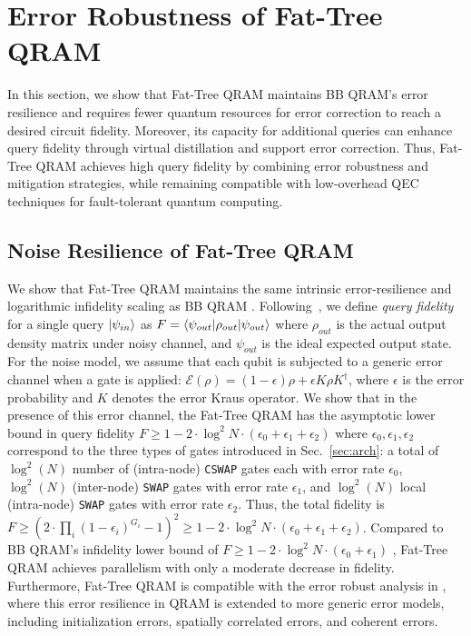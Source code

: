\section{Error Robustness of Fat-Tree QRAM}\label{sec:qec}
In this section, we show that Fat-Tree QRAM maintains BB QRAM's error resilience \cite{hann, xu2023systems} and requires fewer quantum resources for error correction to reach a desired circuit fidelity. Moreover, its capacity for additional queries can enhance query fidelity through virtual distillation \cite{huggins2021virtual} and support error correction. Thus, Fat-Tree QRAM achieves high query fidelity by combining error robustness and mitigation strategies, while remaining compatible with low-overhead QEC techniques for fault-tolerant quantum computing.

\subsection{Noise Resilience of Fat-Tree QRAM}
\label{subsec:noise}

We show that Fat-Tree QRAM maintains the same intrinsic error-resilience and logarithmic infidelity scaling as BB QRAM \cite{hann,xu2023systems}. Following~\cite{hann}, we define \textit{query fidelity} for a single query $\ket{\psi_{in}}$ as $F = \braket{\psi_{out}|\rho_{out}|\psi_{out}}$
where $\rho_{out}$ is the actual output density matrix under noisy channel, and $\psi_{out}$ is the ideal expected output state. For the noise model, we assume that each qubit is subjected to a generic error channel when a gate is applied:
$\mathcal{E}(\rho) = (1-\epsilon) \rho + \epsilon K\rho K^\dag$, where $\epsilon$ is the error probability and  $K$ denotes the error Kraus operator. We show that in the presence of this error channel, the Fat-Tree QRAM has the asymptotic lower bound in query fidelity $F \ge 1 - 2 \cdot \log^2{N}\cdot (\epsilon_0+\epsilon_1+\epsilon_2)$ where $\epsilon_0,\epsilon_1, \epsilon_2$ correspond to the three types of gates introduced in Sec.~\ref{sec:arch}: a total of $\log^2(N)$ number of (intra-node) \texttt{CSWAP} gates each with error rate $\epsilon_0$,  $\log^2(N)$ (inter-node) \texttt{SWAP} gates with error rate $\epsilon_1$, and $\log^2(N)$ local (intra-node) \texttt{SWAP} gates with error rate $\epsilon_2$. Thus, the total fidelity is $F \ge (2 \cdot \prod_i(1-\epsilon_i)^{G_i}-1)^2 \ge 1 - 2 \cdot \log^2{N}\cdot (\epsilon_0+\epsilon_1+\epsilon_2)$.
Compared to BB QRAM's infidelity lower bound of $F \ge 1 -  2\cdot\log^2{N}\cdot(\epsilon_0+\epsilon_1)$ \cite{hann}, Fat-Tree QRAM achieves parallelism with only a moderate decrease in fidelity. Furthermore, Fat-Tree QRAM is compatible with the error robust analysis in \cite{mehta2024analysis}, where this error resilience in QRAM is extended to more generic error models, including initialization errors, spatially correlated errors, and coherent errors.

